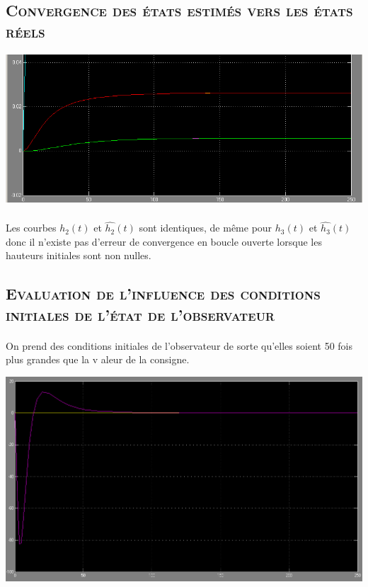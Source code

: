 		\subsection{\textsc {Convergence des états estimés vers les états réels}}
		
		\begin{center}
		\includegraphics[scale=0.5]{question4.PNG} 
		\label{fig5}
		\end{center}
		
		\paragraph{} Les courbes $h_2(t)$ et $\widehat{h_2}(t)$ sont identiques, de même pour $h_3(t)$ et $\widehat{h_3}(t)$ donc il n'existe pas d'erreur de convergence en boucle ouverte lorsque les hauteurs initiales sont non nulles. 
		
		\subsection{\textsc {Evaluation de l’influence des conditions initiales de l’état de l’observateur}}

		
		\paragraph{} On prend des conditions initiales de l'observateur de sorte qu'elles soient 50 fois plus grandes que la v	aleur de la consigne.
		
				
		\begin{center}
		\includegraphics[scale=0.4]{sortiecondi.PNG} 
		\label{fig6}
		\end{center}
		

